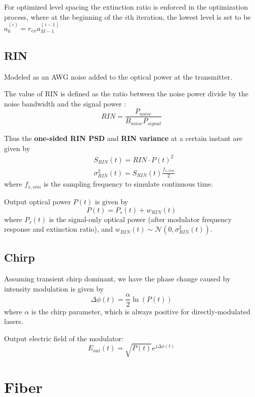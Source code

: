 For optimized level spacing the extinction ratio is enforced in the optimization process, where at the beginning of the $i$th iteration, the lowest level is set to be $a_0^{(i)} = r_{ex}a_{M-1}^{(i-1)}$

\subsection{RIN}
Modeled as an AWG noise added to the optical power at the transmitter.

The value of RIN is defined as the ratio between the noise power divide by the noise bandwidth and the signal power \cite{agilent-RIN-measurement}: 
\begin{equation}
	RIN = \frac{P_{noise}}{B_{noise}P_{signal}}
\end{equation}

Thus the \textbf{one-sided RIN PSD} and \textbf{RIN variance} at a certain instant are given by
\begin{align}
	& S_{RIN}(t) = RIN\cdot P(t)^2 \\
	& \sigma^2_{RIN}(t) = S_{RIN}(t)\frac{f_{s, sim}}{2}
\end{align}
where $f_{s, sim}$ is the sampling frequency to simulate continuous time.

Output optical power $P(t)$ is given by
\begin{equation}
	P(t) = P_s(t) + w_{RIN}(t)
\end{equation}
where $P_s(t)$ is the signal-only optical power (after modulator frequency response and extinction ratio), and $w_{RIN}(t)\sim\mathcal{N}(0, \sigma^2_{RIN}(t))$.

\subsection{Chirp}
Assuming transient chirp dominant, we have the phase change caused by intensity modulation is given by
\begin{equation}
	\Delta\phi(t) = \frac{\alpha}{2}\ln(P(t))
\end{equation}
where $\alpha$ is the chirp parameter, which is always positive for directly-modulated lasers.

Output electric field of the modulator:
\begin{equation}
	E_{out}(t) = \sqrt{P(t)}e^{j\Delta\phi(t)}
\end{equation}

\section{Fiber}
